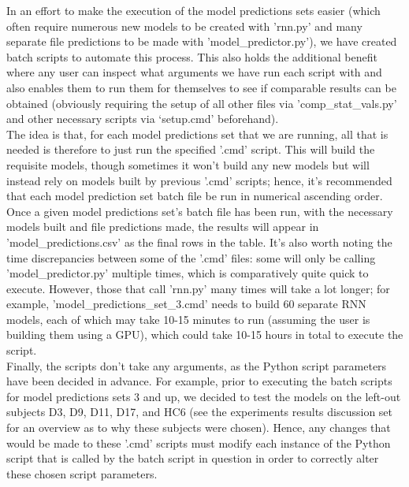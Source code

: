 \documentclass[12pt,twoside]{report}
\begin{document}
\quad In an effort to make the execution of the model predictions sets easier (which often require numerous new models to be created with 'rnn.py' and many separate file predictions to be made with 'model\_predictor.py'), we have created batch scripts to automate this process. This also holds the additional benefit where any user can inspect what arguments we have run each script with and also enables them to run them for themselves to see if comparable results can be obtained (obviously requiring the setup of all other files via 'comp\_stat\_vals.py' and other necessary scripts via ‘setup.cmd’ beforehand).\\

\quad The idea is that, for each model predictions set that we are running, all that is needed is therefore to just run the specified '.cmd' script. This will build the requisite models, though sometimes it won't build any new models but will instead rely on models built by previous '.cmd' scripts; hence, it's recommended that each model prediction set batch file be run in numerical ascending order. Once a given model predictions set’s batch file has been run, with the necessary models built and file predictions made, the results will appear in 'model\_predictions.csv' as the final rows in the table. It's also worth noting the time discrepancies between some of the '.cmd' files: some will only be calling 'model\_predictor.py' multiple times, which is comparatively quite quick to execute. However, those that call 'rnn.py' many times will take a lot longer; for example, 'model\_predictions\_set\_3.cmd' needs to build 60 separate RNN models, each of which may take 10-15 minutes to run (assuming the user is building them using a GPU), which could take 10-15 hours in total to execute the script.\\

\quad Finally, the scripts don't take any arguments, as the Python script parameters have been decided in advance. For example, prior to executing the batch scripts for model predictions sets 3 and up, we decided to test the models on the left-out subjects D3, D9, D11, D17, and HC6 (see the experiments results discussion set for an overview as to why these subjects were chosen). Hence, any changes that would be made to these '.cmd' scripts must modify each instance of the Python script that is called by the batch script in question in order to correctly alter these chosen script parameters.























\end{document}
